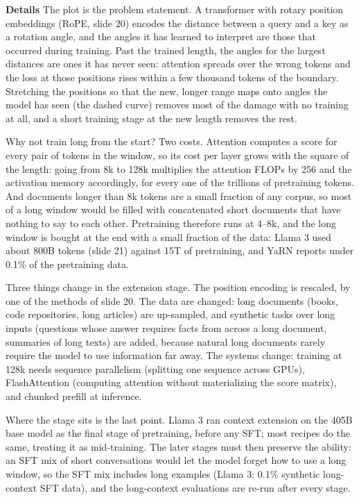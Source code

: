 \documentclass[11pt,letterpaper]{article}
\newcommand{\para}[1]{\medskip\noindent\textbf{#1}\quad}
\begin{document}
\para{Details} The plot is the problem statement. A transformer with rotary position embeddings (RoPE, slide 20) encodes the distance between a query and a key as a rotation angle, and the angles it has learned to interpret are those that occurred during training. Past the trained length, the angles for the largest distances are ones it has never seen: attention spreads over the wrong tokens and the loss at those positions rises within a few thousand tokens of the boundary. Stretching the positions so that the new, longer range maps onto angles the model has seen (the dashed curve) removes most of the damage with no training at all, and a short training stage at the new length removes the rest.

Why not train long from the start? Two costs. Attention computes a score for every pair of tokens in the window, so its cost per layer grows with the square of the length: going from 8k to 128k multiplies the attention FLOPs by 256 and the activation memory accordingly, for every one of the trillions of pretraining tokens. And documents longer than 8k tokens are a small fraction of any corpus, so most of a long window would be filled with concatenated short documents that have nothing to say to each other. Pretraining therefore runs at 4--8k, and the long window is bought at the end with a small fraction of the data: Llama 3 used about 800B tokens (slide 21) against 15T of pretraining, and YaRN reports under 0.1\% of the pretraining data.

Three things change in the extension stage. The position encoding is rescaled, by one of the methods of slide 20. The data are changed: long documents (books, code repositories, long articles) are up-sampled, and synthetic tasks over long inputs (questions whose answer requires facts from across a long document, summaries of long texts) are added, because natural long documents rarely require the model to use information far away. The systems change: training at 128k needs sequence parallelism (splitting one sequence across GPUs), FlashAttention (computing attention without materializing the score matrix), and chunked prefill at inference.

Where the stage sits is the last point. Llama 3 ran context extension on the 405B base model as the final stage of pretraining, before any SFT; most recipes do the same, treating it as mid-training. The later stages must then preserve the ability: an SFT mix of short conversations would let the model forget how to use a long window, so the SFT mix includes long examples (Llama 3: 0.1\% synthetic long-context SFT data), and the long-context evaluations are re-run after every stage.
\end{document}
